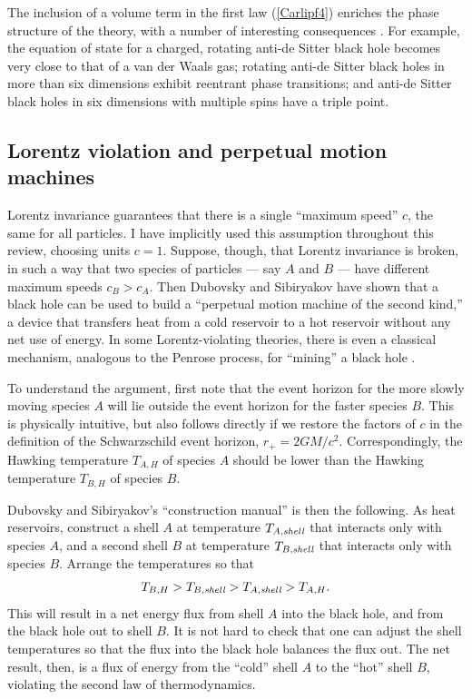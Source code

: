 \documentclass[12pt]{article}
\begin{document}
The inclusion of a volume term in the first law (\ref{Carlipf4}) enriches
the phase structure of the theory, with a number of interesting
consequences \cite{Dolan,MannKub}.  For example, 
the equation of state for a charged, rotating anti-de Sitter black hole 
becomes very close to that of a van der Waals gas; rotating anti-de Sitter 
black holes in more than six dimensions exhibit reentrant phase 
transitions; and anti-de Sitter black holes in six dimensions with multiple 
spins have a triple point.

\subsection{Lorentz violation and perpetual motion machines}

Lorentz invariance guarantees that there is a single ``maximum speed''
$c$, the same for all particles.  I have implicitly used this assumption 
throughout this review, choosing units $c=1$.  Suppose, though,
that Lorentz invariance is broken, in such a way that two species of
particles --- say $A$ and $B$ --- have different maximum speeds
$c_B>c_A$.  Then Dubovsky and Sibiryakov have shown  \cite{DubSib} 
that a black hole can be used to build a ``perpetual motion machine
of the second kind,'' a device that transfers heat from a cold reservoir to 
a hot reservoir without any net use of energy.  In some 
Lorentz-violating theories, there is even a classical mechanism, 
analogous to the Penrose process, for ``mining'' a black hole \cite{Eling}. 

To understand the argument, first note that the event horizon for
the more slowly moving species $A$ will lie outside the event horizon 
for the faster species $B$.  This is physically intuitive, but also follows
directly if we restore the factors of $c$ in the definition of the
Schwarzschild event horizon, $r_+ = 2GM/c^2$.
Correspondingly, the Hawking temperature $T_{A,H}$ of species $A$ 
should be lower than the Hawking temperature $T_{B,H}$ of species $B$.  

Dubovsky and Sibiryakov's ``construction manual'' is then the 
following.  As heat reservoirs, construct a shell $A$ at temperature
$T_{A,\hbox{\scriptsize\it shell}}$ that interacts only with species $A$,
and a second shell $B$ at temperature $T_{B,\hbox{\scriptsize\it shell}}$ 
that interacts only with species $B$.  Arrange the temperatures so that
\begin{align}
T_{B,H}>T_{B,\hbox{\scriptsize\it shell}}>T_{A,\hbox{\scriptsize\it shell}}
   >T_{A,H}  .
\label{Carlipf6}
\end{align}
This will result in a net energy flux from shell $A$ into the black hole,
and from the black hole out to shell $B$.   It is not hard to check that
one can adjust the shell temperatures so that the flux into the black
hole balances the flux out.  The net result, then, is a flux of energy
from the ``cold'' shell $A$ to the ``hot'' shell $B$, violating the
second law of thermodynamics.
\end{document}
